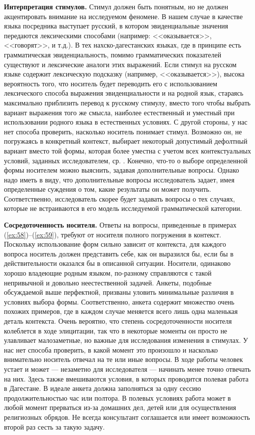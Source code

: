 \textbf{Интерпретация стимулов.} Стимул должен быть понятным, но не должен акцентировать внимание на исследуемом феномене. В нашем случае в качестве языка посредника выступает русский, в котором эвиденциальные значения передаются лексическими способами (например: <<оказывается>>, <<говорят>>, и т.д.). В тех нахско-дагестанских языках, где в принципе есть грамматическая эвиденциальность, помимо грамматических показателей существуют и лексические аналоги этих выражений. Если стимул на русском языке содержит лексическую подсказку (например, <<оказывается>>), высока вероятность того, что носитель будет переводить его с использованием лексического способа выражения эвиденциальности и на родной язык, стараясь максимально приблизить перевод к русскому стимулу, вместо того чтобы выбрать вариант выражения того же смысла, наиболее естественный и уместный при использовании родного языка в естественных условиях. С другой стороны, у нас нет способа проверить, насколько носитель понимает стимул. Возможно он, не погружаясь в конкретный контекст, выбирает некоторый допустимый дефолтный вариант вместо той формы, которая более уместна с учетом всех контекстуальных условий, заданных исследователем, ср. \citep[18]{aikhenvald2004}. Конечно, что-то о выборе определенной формы носителем можно выяснить, задавая дополнительные вопросы. Однако надо иметь в виду, что дополнительные вопросы исследователь задает, имея определенные суждения о том, какие результаты он может получить. Соответственно, исследователь скорее будет задавать вопросы о тех случаях, которые не встраиваются в его модель исследуемой грамматической категории. 
\par \textbf{Сосредоточенность носителя.} Ответы на вопросы, приведенные в примерах (\ref{ex:58})--(\ref{ex:59}), требуют от носителя полного погружения в контекст. Поскольку использование форм сильно зависит от контекста, для каждого вопроса носитель должен представить себе, как он выразился бы, если бы в действительности оказался бы в описанной ситуации. Носители, одинаково хорошо владеющие родным языком, по-разному справляются с такой непривычной и довольно неестественной задачей. Анкеты, подобные обсуждаемой выше перфектной, призваны уловить минимальные различия в условиях выбора формы. Соответственно, анкета содержит множество очень похожих примеров, где в каждом случае меняется всего лишь одна маленькая деталь контекста. Очень вероятно, что степень сосредоточенности носителя колеблется в ходе элицитации, так что в некоторые моменты он просто не улавливает малозаметные, но важные для исследования изменения в стимулах. У нас нет способа проверить, в какой момент это произошло и насколько внимательно носитель отвечал на те или иные вопросы. В ходе работы человек устает и может --- незаметно для исследователя --- начинать менее точно отвечать на них. Здесь также вмешиваются условия, в которых проводится полевая работа в Дагестане. В идеале анкета должна заполняться за одну сессию продолжительностью час или полтора. В полевых условиях работа может в любой момент прерваться из-за домашних дел, детей или для осуществления религиозных обрядов. Не всегда консультант соглашается или имеет возможность второй раз сесть за такую задачу.
